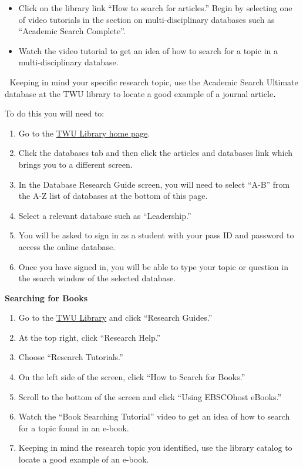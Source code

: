 \documentclass[
  letterpaper,
  DIV=11,
  numbers=noendperiod]{scrreprt}
\providecommand{\tightlist}{%
  \setlength{\itemsep}{0pt}\setlength{\parskip}{0pt}}\usepackage{longtable,booktabs,array}
\begin{document}
\begin{itemize}
\tightlist
\item
  Click on the library link ``How to search for articles.'' Begin by
  selecting one of video tutorials in the section on multi-disciplinary
  databases such as ``Academic Search Complete''.
\item
  Watch the video tutorial to get an idea of how to search for a topic
  in a multi-disciplinary database.
\end{itemize}

📖 Keeping in mind your specific research topic, use the Academic Search
Ultimate database at the TWU library to locate a good example of a
journal article\textbf{.}

To do this you will need to:

\begin{enumerate}
\def\labelenumi{\arabic{enumi}.}
\tightlist
\item
  Go to the \href{https://www.twu.ca/academics/library}{TWU Library home
  page}.
\item
  Click the databases tab and then click the articles and databases link
  which brings you to a different screen.
\item
  In the Database Research Guide screen, you will need to select ``A-B''
  from the A-Z list of databases at the bottom of this page.
\item
  Select a relevant database such as ``Leadership.''
\item
  You will be asked to sign in as a student with your pass ID and
  password to access the online database.
\item
  Once you have signed in, you will be able to type your topic or
  question in the search window of the selected database.
\end{enumerate}

\textbf{Searching for Books}

\begin{enumerate}
\def\labelenumi{\arabic{enumi}.}
\tightlist
\item
  Go to the \href{https://www.twu.ca/academics/library}{TWU Library} and
  click ``Research Guides.''
\item
  At the top right, click ``Research Help.''
\item
  Choose ``Research Tutorials.''
\item
  On the left side of the screen, click ``How to Search for Books.''
\item
  Scroll to the bottom of the screen and click ``Using EBSCOhost
  eBooks.''
\item
  Watch the ``Book Searching Tutorial'' video to get an idea of how to
  search for a topic found in an e-book.
\item
  Keeping in mind the research topic you identified, use the library
  catalog to locate a good example of an e-book.
\end{enumerate}
\end{document}
